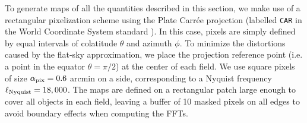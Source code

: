 \documentclass[a4paper,11pt]{article}
\begin{document}
    To generate maps of all the quantities described in this section, we make use of a rectangular pixelization scheme using the Plate Carr\'ee projection (labelled {\tt CAR} in the World Coordinate System standard \cite{2002A&A...395.1077C}). In this case, pixels are simply defined by equal intervals of colatitude $\theta$ and azimuth $\phi$. To minimize the distortions caused by the flat-sky approximation, we place the projection reference point (i.e. a point in the equator $\theta=\pi/2$) at the center of each field. We use square pixels of size $\alpha_{\rm pix}=0.6$ arcmin on a side, corresponding to a Nyquist frequency $\ell_{\rm Nyquist}=18,000$. The maps are defined on a rectangular patch large enough to cover all objects in each field, leaving a buffer of 10 masked pixels on all edges to avoid boundary effects when computing the FFTs.
  
\end{document}

